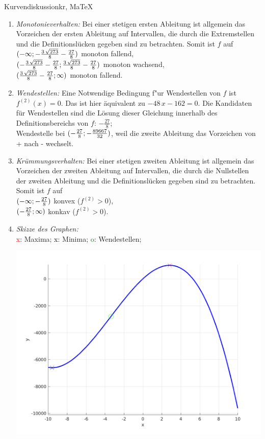 \begin{MAufgabe}{Kurvendiskussion}{kr, MaTeX}
\begin{enumerate}
 \item \emph{Monotonieverhalten:} 
 Bei einer stetigen ersten Ableitung ist allgemein das Vorzeichen der ersten Ableitung auf Intervallen, die durch die Extremstellen und die Definitionsl\"ucken gegeben sind zu betrachten. Somit ist $f$ auf \\ 
 $(-\infty; - \frac{3\, \sqrt{273}}{8} - \frac{27}{8})$ monoton fallend, \\ 
 $( - \frac{3\, \sqrt{273}}{8} - \frac{27}{8};\frac{3\, \sqrt{273}}{8} - \frac{27}{8})$ monoton  wachsend, \\ 
 $(\frac{3\, \sqrt{273}}{8} - \frac{27}{8}; \infty)$ monoton fallend. \\ 
 \item \emph{Wendestellen:} 
 Eine Notwendige Bedingung f"ur Wendestellen von $f$ ist $f^{(2)}(x)=0$. 
 Das ist hier \"aquivalent zu $ - 48\, x - 162=0$. 
 Die Kandidaten f\"ur Wendestellen sind die L\"osung dieser Gleichung innerhalb des Definitionsbereichs von $f$: $- \frac{27}{8}$; \\ 
 Wendestelle bei $(- \frac{27}{8};- \frac{89667}{32})$, weil die zweite Ableitung das Vorzeichen von + nach - wechselt. \\ 
 \item \emph{Kr\"ummungsverhalten:} 
 Bei einer stetigen zweiten Ableitung ist allgemein das Vorzeichen der zweiten Ableitung auf Intervallen, die durch die Nullstellen der zweiten Ableitung und die Definitionsl\"ucken gegeben sind zu betrachten. 
 Somit ist $f$ auf \\ 
 $(-\infty ;- \frac{27}{8})$  konvex ($f^{(2)}>0$), \\ 
 $(- \frac{27}{8}; \infty)$  konkav ($f^{(2)}>0$). \\ 
 \item \emph{Skizze des Graphen:} \\ 
 {\textcolor{red} x}: Maxima; {\textcolor{black} x}: Minima; {\textcolor{green} o}: Wendestellen; 
  \begin{center}
  \includegraphics[width=0.8\linewidth]{Abb_zur_Ag_autogenerated_fractions_2.png} \end{center}
  
 \end{enumerate}
 \else\relax\fi
  \end{MAufgabe}